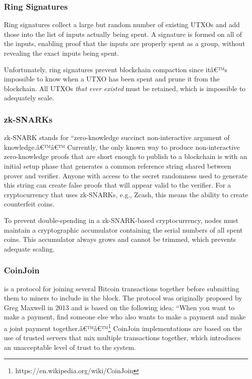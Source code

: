\documentclass[8pt,fleqn,openany]{book}
\begin{document}
	\subsubsection{Ring Signatures} Ring signatures collect a large but random number of existing UTXOs and add those into the list of inputs actually being spent. A signature is formed on all of the inputs, enabling proof that the inputs are properly spent as a group, without revealing the exact inputs being spent. 
	
	Unfortunately, ring signatures prevent blockchain compaction since itâ€™s impossible to know when a UTXO has been spent and prune it from the blockchain. All UTXOs \textit{that ever existed} must be retained, which is impossible to adequately scale.
	
	\subsubsection{zk-SNARKs} zk-SNARK stands for ``zero-knowledge succinct non-interactive argument of knowledge.â€™â€™ Currently, the only known way to produce non-interactive zero-knowledge proofs that are short enough to publish to a blockchain is with an initial setup phase that generates a common reference string shared between prover and verifier. Anyone with access to the secret randomness used to generate this string can create false proofs that will appear valid to the verifier. For a cryptocurrency that uses zk-SNARKs, e.g., Zcash, this means the ability to create counterfeit coins. 
	
	To prevent double-spending in a zk-SNARK-based cryptocurrency, nodes must maintain a cryptographic accumulator containing the serial numbers of all spent coins. This accumulator always grows and cannot be trimmed, which prevents adequate scaling.
	
	\subsubsection{CoinJoin} is a protocol for joining several Bitcoin transactions together before submitting them to miners to include in the block. The protocol was originally proposed by Greg Maxwell in 2013 and is based on the following idea: ``When you want to make a payment, find someone else who also wants to make a payment and make a joint payment together.â€™â€™\footnote{https://en.wikipedia.org/wiki/CoinJoin} CoinJoin implementations are based on the use of trusted servers that mix multiple transactions together, which introduces an unacceptable level of trust to the system.
	
\end{document}
